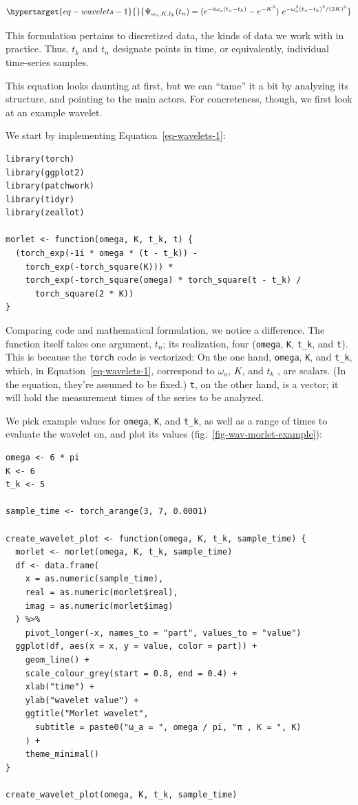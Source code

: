 \documentclass[
  letterpaper,
]{krantz}
\begin{document}
\begin{equation}\protect\hypertarget{eq-wavelets-1}{}{
\Psi_{\omega_{a},K,t_{k}}(t_n) = (e^{-i \omega_{a} (t_n - t_k)} - e^{-K^2}) \ e^{- \omega_a^2 (t_n - t_k )^2 /(2K )^2} 
}\label{eq-wavelets-1}\end{equation}

This formulation pertains to discretized data, the kinds of data we work
with in practice. Thus, \(t_k\) and \(t_n\) designate points in time, or
equivalently, individual time-series samples.

This equation looks daunting at first, but we can ``tame'' it a bit by
analyzing its structure, and pointing to the main actors. For
concreteness, though, we first look at an example wavelet.

We start by implementing Equation~\ref{eq-wavelets-1}:

\begin{verbatim}
library(torch)
library(ggplot2)
library(patchwork)
library(tidyr)
library(zeallot)
  
morlet <- function(omega, K, t_k, t) {
  (torch_exp(-1i * omega * (t - t_k)) -
    torch_exp(-torch_square(K))) *
    torch_exp(-torch_square(omega) * torch_square(t - t_k) /
      torch_square(2 * K))
}
\end{verbatim}

Comparing code and mathematical formulation, we notice a difference. The
function itself takes one argument, \(t_n\); its realization, four
(\texttt{omega}, \texttt{K}, \texttt{t\_k}, and \texttt{t}). This is
because the \texttt{torch} code is vectorized: On the one hand,
\texttt{omega}, \texttt{K}, and \texttt{t\_k}, which, in
Equation~\ref{eq-wavelets-1}, correspond to \(\omega_{a}\), \(K\), and
\(t_k\) , are scalars. (In the equation, they're assumed to be fixed.)
\texttt{t}, on the other hand, is a vector; it will hold the measurement
times of the series to be analyzed.

We pick example values for \texttt{omega}, \texttt{K}, and
\texttt{t\_k}, as well as a range of times to evaluate the wavelet on,
and plot its values (fig.~\ref{fig-wav-morlet-example}):

\begin{verbatim}
omega <- 6 * pi
K <- 6
t_k <- 5
 
sample_time <- torch_arange(3, 7, 0.0001)

create_wavelet_plot <- function(omega, K, t_k, sample_time) {
  morlet <- morlet(omega, K, t_k, sample_time)
  df <- data.frame(
    x = as.numeric(sample_time),
    real = as.numeric(morlet$real),
    imag = as.numeric(morlet$imag)
  ) %>%
    pivot_longer(-x, names_to = "part", values_to = "value")
  ggplot(df, aes(x = x, y = value, color = part)) +
    geom_line() +
    scale_colour_grey(start = 0.8, end = 0.4) +
    xlab("time") +
    ylab("wavelet value") +
    ggtitle("Morlet wavelet",
      subtitle = paste0("ω_a = ", omega / pi, "π , K = ", K)
    ) +
    theme_minimal()
}

create_wavelet_plot(omega, K, t_k, sample_time)
\end{verbatim}
\end{document}

